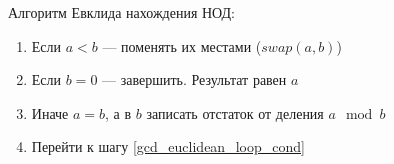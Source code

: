 Алгоритм Евклида нахождения НОД:
\begin{enumerate}
 \item Если $a<b$ --- поменять их местами ($swap(a, b)$)
 \item \label{gcd_euclidean_loop_cond} Если $b=0$ --- завершить. Результат равен $a$
 \item Иначе $a = b$, а в $b$ записать отстаток от деления $a \mod b$
 \item Перейти к шагу \ref{gcd_euclidean_loop_cond}
\end{enumerate}
